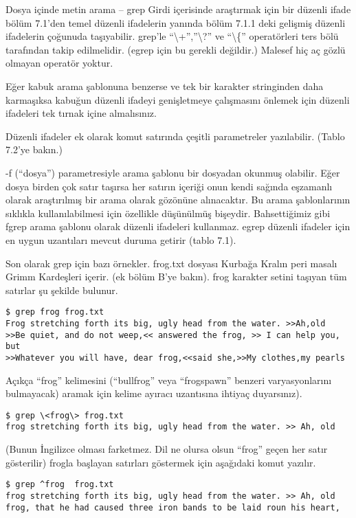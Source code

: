 \begin{section}{Dosya içinde metin arama – grep}
Girdi içerisinde araştırmak için bir düzenli ifade bölüm 7.1’den temel düzenli ifadelerin yanında bölüm 7.1.1 deki gelişmiş düzenli ifadelerin çoğunuda taşıyabilir. grep’le “\textbackslash +”,”\textbackslash ?” ve “\textbackslash \{” operatörleri ters bölü tarafından takip edilmelidir. (egrep için bu gerekli değildir.) Malesef hiç aç gözlü olmayan operatör yoktur. 

Eğer kabuk arama şablonuna benzerse ve tek bir karakter stringinden daha karmaşıksa kabuğun düzenli ifadeyi genişletmeye çalışmasını önlemek için düzenli ifadeleri tek tırnak içine almalısınız.

Düzenli ifadeler ek olarak komut satırında çeşitli parametreler yazılabilir. (Tablo 7.2’ye bakın.)

-f (“dosya”) parametresiyle arama şablonu bir dosyadan okunmuş olabilir. Eğer dosya birden çok satır taşırsa her satırın içeriği onun kendi sağında eşzamanlı olarak araştırılmış bir arama olarak gözönüne alınacaktır. Bu arama şablonlarının sıklıkla kullanılabilmesi için özellikle düşünülmüş bişeydir. 
Bahsettiğimiz gibi fgrep arama şablonu olarak düzenli ifadeleri kullanmaz. egrep düzenli ifadeler için en uygun uzantıları mevcut duruma getirir (tablo 7.1).

Son olarak grep için bazı örnekler. frog.txt dosyası Kurbağa Kralın peri masalı Grimm Kardeşleri içerir. (ek bölüm B’ye bakın). frog karakter setini taşıyan tüm satırlar şu şekilde bulunur.
\begin{verbatim}
$ grep frog frog.txt
Frog stretching forth its big, ugly head from the water. >>Ah,old
>>Be quiet, and do not weep,<< answered the frog, >> I can help you, but
>>Whatever you will have, dear frog,<<said she,>>My clothes,my pearls
\end{verbatim}

Açıkça “frog” kelimesini (“bullfrog” veya “frogspawn” benzeri  varyasyonlarını bulmayacak) aramak için kelime ayıracı uzantısına ihtiyaç duyarsınız).

\begin{verbatim}
$ grep \<frog\> frog.txt
frog stretching forth its big, ugly head from the water. >> Ah, old
\end{verbatim}

(Bunun İngilizce olması farketmez. Dil ne olursa olsun “frog” geçen her satır gösterilir) frogla başlayan satırları göstermek için aşağıdaki komut yazılır.
\begin{verbatim}
$ grep ^frog  frog.txt
frog stretching forth its big, ugly head from the water. >> Ah, old
frog, that he had caused three iron bands to be laid roun his heart,
\end{verbatim}


\end{section}
